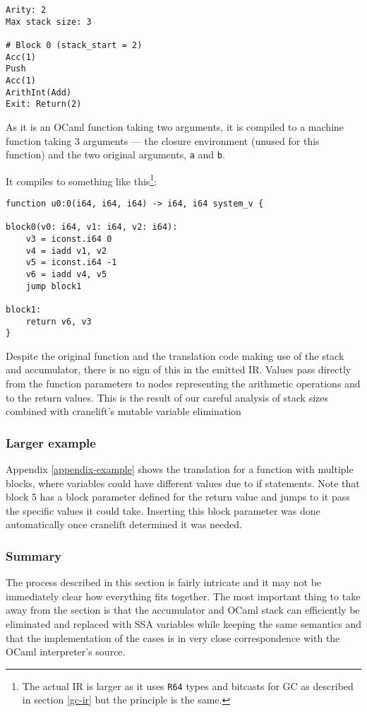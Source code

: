 \begin{verbatim}
Arity: 2
Max stack size: 3

# Block 0 (stack_start = 2)
Acc(1)
Push
Acc(1)
ArithInt(Add)
Exit: Return(2)
\end{verbatim}

As it is an OCaml function taking two arguments, it is compiled to a machine function taking 3
arguments --- the closure environment (unused for this function) and the two original arguments,
\texttt{a} and \texttt{b}.

It compiles to something like this\footnote{The actual IR is larger as it uses \texttt{R64} types
      and bitcasts for GC as
      described in section \ref{gc-ir} but the principle is the same.}:

\begin{verbatim}
function u0:0(i64, i64, i64) -> i64, i64 system_v {

block0(v0: i64, v1: i64, v2: i64):
    v3 = iconst.i64 0
    v4 = iadd v1, v2
    v5 = iconst.i64 -1
    v6 = iadd v4, v5
    jump block1

block1:
    return v6, v3
}
\end{verbatim}

Despite the original function and the translation code making use of the stack and accumulator,
there is no sign of this in the emitted IR. Values pass directly from the function parameters to
nodes representing the arithmetic operations and to the return values. This is the result of our
careful analysis of stack sizes combined with cranelift's mutable variable elimination

\subsubsection{Larger example}

Appendix \ref{appendix-example} shows the translation for a function with multiple blocks, where
variables could have different values due to if statements.  Note that block 5 has a block
parameter defined for the return value and jumps to it pass the specific values it could take.
Inserting this block parameter was done automatically once cranelift determined it was needed.

\subsubsection{Summary}

The process described in this section is fairly intricate and it may not be immediately clear how
everything fits together. The most important thing to take away from the section is that the
accumulator and OCaml stack can efficiently be eliminated and replaced with SSA variables while
keeping the same semantics and that the implementation of the cases is in very close correspondence
with the OCaml interpreter's source.


